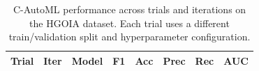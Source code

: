 \documentclass[diagnostics,article,accept,pdftex,moreauthors]{Definitions/mdpi}
\begin{document}
\vspace{-9pt}


\begin{table}[H]
\caption{C-AutoML performance across trials and iterations on the
  \ac{HGOIA} dataset. Each trial uses a different
  train/validation split and hyperparameter
  configuration.\label{tab:cautoml-performance}}
\begin{tabularx}{\linewidth}{LlLCCCCC}
\toprule





\textbf{Trial} & \textbf{Iter} & \textbf{Model} &
\textbf{F1} & \textbf{Acc} & \textbf{Prec} & \textbf{Rec} & \textbf{AUC} \\
\midrule






\end{tabularx}
\end{table}
\end{document}
